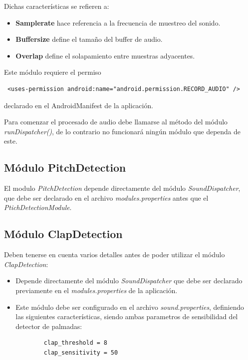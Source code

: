 Dichas características se refieren a:

\begin{itemize}
	\item \textbf{Samplerate} hace referencia a la frecuencia de muestreo del sonido.
	\item \textbf{Buffersize} define el tamaño del buffer de audio.
	\item \textbf{Overlap} define el solapamiento entre muestras adyacentes.
\end{itemize}


Este módulo requiere el permiso \begin{verbatim} <uses-permission android:name="android.permission.RECORD_AUDIO" /> \end{verbatim} declarado en el AndroidManifest de la aplicación.

Para comenzar el procesado de audio debe llamarse al método del módulo \textit{runDispatcher()}, de lo contrario no funcionará ningún módulo que dependa de este.


\subsection{Módulo PitchDetection }
\label{manual:pitchdetection}

El modulo \textit{PitchDetection} depende directamente del módulo \textit{SoundDispatcher}, que debe ser declarado en el archivo \textit{modules.properties} antes que el \textit{PtichDetectionModule}.

\subsection{Módulo ClapDetection}
\label{manual:clapdetection}

Deben tenerse en cuenta varios detalles antes de poder utilizar el módulo \textit{ClapDetection}:
\begin{itemize}
	\item Depende directamente del módulo \textit{SoundDispatcher} que debe ser declarado previamente en el \textit{modules.properties} de la aplicación.
	\item Este módulo debe ser configurado en el archivo \textit{sound.properties}, definiendo las siguientes características, siendo ambas parametros de sensibilidad del detector de palmadas:
	\begin{verbatim}
		clap_threshold = 8
		clap_sensitivity = 50
	\end{verbatim}
\end{itemize}

